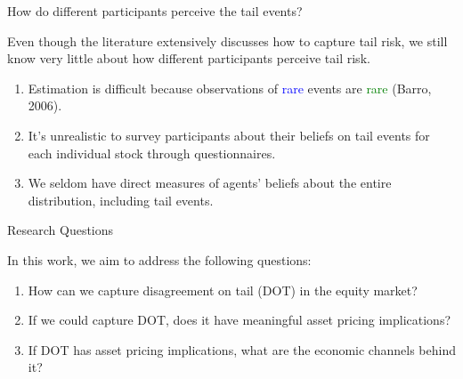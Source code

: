 \documentclass[11pt, aspectratio=169]{beamer}
\newenvironment{wideitemize}{\itemize\addtolength{\itemsep}{10pt}}{\enditemize}
\begin{document}
\begin{frame}{How do different participants perceive the tail events?}
    \bigskip
    \begin{wideitemize}
    \item Even though the literature extensively discusses how to capture tail risk, \alert{we still know very little about how different participants perceive tail risk.}
    \bigskip
    \begin{enumerate}
    \item Estimation is difficult because observations of \textcolor{blue}{rare} events are \textcolor{green}{rare} (Barro, 2006).
    \bigskip
    \item It's unrealistic to survey participants about their beliefs on tail events for each individual stock through questionnaires.
    \bigskip  
    \item We seldom have direct measures of agents' beliefs about the entire distribution, including \alert{tail events}. 
    \end{enumerate}
    \end{wideitemize}
\end{frame}

\begin{frame}{Research Questions}
    \bigskip
    \begin{wideitemize}
    \item In this work, we aim to address the following questions:
    \bigskip
    \begin{enumerate}
        \item How can we \alert{capture} disagreement on tail (DOT) in the equity market?
        \bigskip
        \item If we could capture DOT, does it have meaningful \alert{asset pricing implications}?
        \bigskip
        \item If DOT has asset pricing implications, what are the \alert{economic channels} behind it?
    \end{enumerate}
    \end{wideitemize}
\end{frame}
\end{document}
